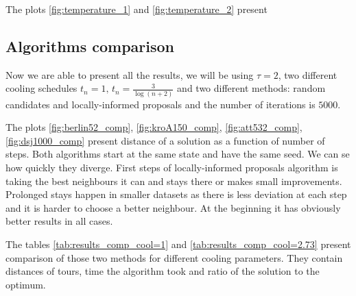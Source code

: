 	
	
	The plots \ref{fig:temperature_1} and \ref{fig:temperature_2} present 
	
\subsection{Algorithms comparison}
	Now we are able to present all the results, we will be using $\tau=2$, two different cooling schedules $t_n=1, \, t_n=\frac{3}{\log(n+2)}$ and two different methods: random candidates and locally-informed proposals and the number of iterations is $5000$.
	
	
	
	The plots \ref{fig:berlin52_comp}, \ref{fig:kroA150_comp}, \ref{fig:att532_comp}, \ref{fig:dsj1000_comp} present distance of a solution as a function of number of steps. Both algorithms start at the same state and have the same seed. We can se how quickly they diverge. First steps of locally-informed proposals algorithm is taking the best neighbours it can and stays there or makes small improvements. Prolonged stays happen in smaller datasets as there is less deviation at each step and it is harder to choose a better neighbour. At the beginning it has obviously better results in all cases. 
	
	
	
	The tables \ref{tab:results_comp_cool=1} and \ref{tab:results_comp_cool=2.73} present comparison of those two methods for different cooling parameters. They contain distances of tours, time the algorithm took and ratio of the solution to the optimum.